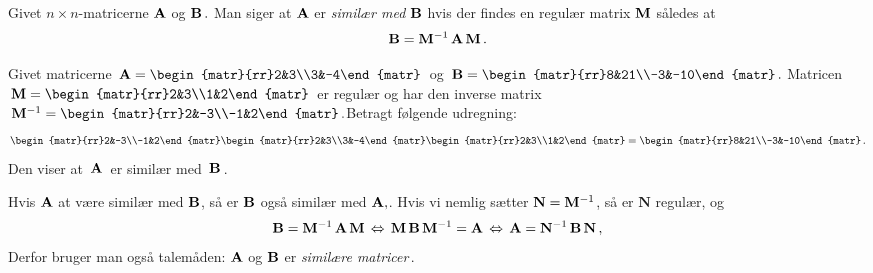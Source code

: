 \begin{definition}\label{DefSim}
Givet $n\times n$-matricerne $\mathbf{A}$ og $\mathbf{B}\,.$ Man siger at $\mathbf{A}$ er \textit{similær med} $\mathbf{B}$ hvis der findes en regulær matrix $\mathbf{M}$ således at
\begin{equation}\label{tn8.defSimilar} 
\mathbf{B}=\mathbf{M}^{-1}\,\mathbf{A}\,\mathbf{M}\,.
\end{equation}
\end{definition}

\begin{example}
Givet matricerne $\,\mA=\begin{matr}{rr}2&3\\3&-4\end{matr}\,$ og $\,\mB=\begin{matr}{rr}8&21\\-3&-10\end{matr}\,.$\bs
Matricen $\,\mM=\begin{matr}{rr}2&3\\1&2\end{matr}\,$ er regulær og har den inverse matrix $\,\mM^{-1}=\begin{matr}{rr}2&-3\\-1&2\end{matr}\,.$\bs Betragt følgende udregning:
$$\begin{matr}{rr}2&-3\\-1&2\end{matr}
\begin{matr}{rr}2&3\\3&-4\end{matr}
\begin{matr}{rr}2&3\\1&2\end{matr}
=\begin{matr}{rr}8&21\\-3&-10\end{matr}\,.$$\bs
Den viser at $\,\mathbf{A}\,$ er similær med $\,\mathbf{B}\,$. 
\end{example}

\begin{aha}
Hvis $\mathbf{A}$ at være similær med $\mathbf{B}$, så er $\mathbf{B}$ også  similær med $\mathbf{A},$. Hvis vi nemlig sætter $\mathbf N=\mathbf{M}^{-1}$, så er $\mathbf N$ regulær, og
$$ \mathbf{B}=\mathbf{M}^{-1}\,\mathbf{A}\,\mathbf{M}
\,\Leftrightarrow\,
\mathbf{M}\,\mathbf{B}\,\mathbf{M}^{-1}=\mathbf{A}
\,\Leftrightarrow\,
\mathbf{A}=\mathbf N^{-1}\,\mathbf{B}\,\mathbf N\,,$$
Derfor bruger man også talemåden: $\mathbf{A}$ og $\mathbf{B}$ er \textit{similære matricer}\,.
\end{aha}

